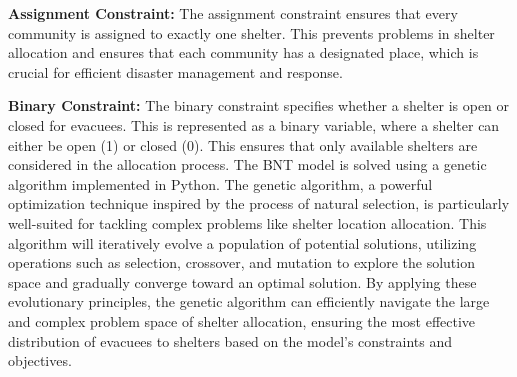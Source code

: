 \textbf{Assignment Constraint: }The assignment constraint ensures that every community is assigned to exactly one shelter. This prevents problems in shelter allocation and ensures that each community has a designated place, which is crucial for efficient disaster management and response.

\textbf{Binary Constraint: } The binary constraint specifies whether a shelter is open or closed for evacuees. This is represented as a binary variable, where a shelter can either be open (1) or closed (0). This ensures that only available shelters are considered in the allocation process.
The BNT model is solved using a genetic algorithm implemented in Python. The genetic algorithm, a powerful optimization technique inspired by the process of natural selection, is particularly well-suited for tackling complex problems like shelter location allocation. This algorithm will iteratively evolve a population of potential solutions, utilizing operations such as selection, crossover, and mutation to explore the solution space and gradually converge toward an optimal solution. By applying these evolutionary principles, the genetic algorithm can efficiently navigate the large and complex problem space of shelter allocation, ensuring the most effective distribution of evacuees to shelters based on the model’s constraints and objectives.
